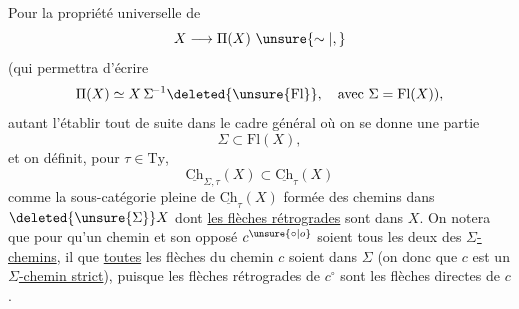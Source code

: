 Pour la propriété universelle de
\[X\longrightarrow\Pi(X)\ \unsure{\sim|,}\]
(qui permettra d'écrire
\[\Pi(X)\simeq X\,\Sigma^{\!-1}\deleted{\unsure{\mathrm{Fl}}},\quad\text{avec }\Sigma=\mathrm{Fl}(X)),\]
autant l'établir tout de suite dans le cadre général où on se donne une partie
\[\Sigma\subset\mathrm{Fl}(X),\]
et on définit, pour $\tau\in\mathrm{Ty}$,
\[\underline{\mathrm{Ch}}_{\Sigma,\tau}(X)\subset\underline{\mathrm{Ch}}_\tau(X)\]
comme la sous-catégorie pleine de $\underline{\mathrm{Ch}}_\tau(X)$ formée des chemins dans $\deleted{\unsure{\Sigma}}X$ dont \uline{ les flèches rétrogrades}
sont dans $X$. On notera que pour qu'un chemin  et son opposé $c^{\unsure{\circ|o}}$ soient tous les deux des \uline{$\Sigma$-chemins}, il  que \uline{toutes} les flèches du chemin $c$ soient dans $\Sigma$ (on  donc que $c$ est un \uline{$\Sigma$-chemin strict}), puisque les flèches rétrogrades de $c^\circ$ sont les flèches  directes de $c$.

